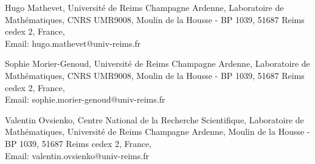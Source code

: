 \documentclass{article}[12pt]
\theoremstyle{plain}
\theoremstyle{definition}
\begin{document}
\bigskip 

\bigskip  

\noindent
{\sc

\noindent
{Hugo Mathevet,
Universit\'e de Reims Champagne Ardenne,
Laboratoire de Math\'e\-ma\-tiques, CNRS UMR9008,
Moulin de la Housse - BP 1039,
51687 Reims cedex 2,
France,
}\\
{Email:  hugo.mathevet@univ-reims.fr}

\medskip

\noindent
{Sophie Morier-Genoud,
Universit\'e de Reims Champagne Ardenne,
Laboratoire de Math\'e\-ma\-tiques, CNRS UMR9008,
Moulin de la Housse - BP 1039,
51687 Reims cedex 2,
France,
}\\
{Email:  sophie.morier-genoud@univ-reims.fr}

\medskip

\noindent
{Valentin Ovsienko,
Centre National de la Recherche Scientifique,
Laboratoire de Math\'e\-ma\-tiques,
Universit\'e de Reims Champagne Ardenne,
Moulin de la Housse - BP 1039,
51687 Reims cedex 2,
France},\\
{Email:  valentin.ovsienko@univ-reims.fr}
}
\end{document}
